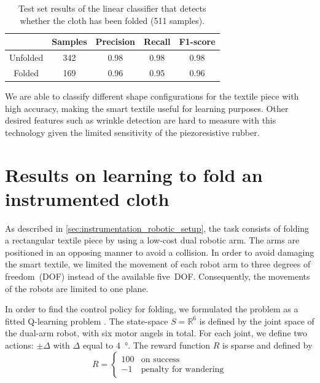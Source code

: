 \documentclass[\home/main.tex]{subfiles}
\begin{document}
\begin{table}[htpb]
    \centering
    \caption{Test set results of the linear classifier that detects whether the cloth has been folded (511 samples).}
    \label{table:classifier_results}
    \begin{tabular}{@{} ccccc @{}}
        \toprule
                 & Samples & Precision & Recall & F1-score \\
        \midrule
        Unfolded & 342     & 0.98      & 0.98   & 0.98     \\
        Folded   & 169     & 0.96      & 0.95   & 0.96     \\
        \bottomrule
    \end{tabular}
\end{table}

We are able to classify different shape configurations for the textile piece with high accuracy, making the smart textile useful for learning purposes. Other desired features such as wrinkle detection are hard to measure with this technology given the limited sensitivity of the piezoresistive rubber.


\section{Results on learning to fold an instrumented cloth}\label{sec:instrumentation_results}

As described in \cref{sec:instrumentation_robotic_setup}, the task consists of folding a rectangular textile piece by using a low-cost dual robotic arm. The arms are positioned in an opposing manner to avoid a collision. In order to avoid damaging the smart textile, we limited the movement of each robot arm to three degrees of freedom~(DOF) instead of the available five~DOF. Consequently, the movements of the robots are limited to one plane.

In order to find the control policy for folding, we formulated the problem as a fitted Q-learning problem \autocite{Watkins1992}. The state-space $S=\mathbb{R}^6$ is defined by the joint space of the dual-arm robot, with six motor angels in total. For each joint, we define two actions: $\pm \Delta$ with $\Delta$ equal to \qty{4}{\degree}. The reward function $R$ is sparse and defined by
\begin{equation} \label{eq:instr_reward_function}
    R=
    \begin{cases}
        100 & \text{on success}            \\
        -1  & \text{penalty for wandering}
    \end{cases}
\end{equation}
\end{document}
